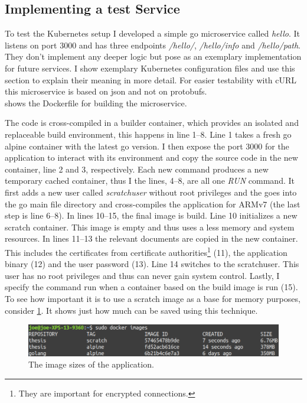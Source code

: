 \subsection{Implementing a test Service} \label{sec:testService}
To test the Kubernetes setup I developed a simple go microservice called \textit{hello}. It listens on port 3000 and has three endpoints \textit{/hello/}, \textit{/hello/info} and \textit{/hello/path}. They don't implement any deeper logic but pose as an exemplary implementation for future services. I show exemplary Kubernetes configuration files and use this section to explain their meaning in more detail. For easier testability with cURL this microservice is based on json and not on protobufs.\\
 shows the Dockerfile for building the microservice.

The code is cross-compiled in a builder container, which provides an isolated and replaceable build environment, this happens in line 1--8. Line 1 takes a fresh go alpine container with the latest go version. I then expose the port 3000 for the application to interact with its environment and copy the source code in the new container, line 2 and 3, respectively. Each new command produces a new temporary cached container, thus I the lines, 4--8, are all one \textit{RUN} command. It first adds a new user called \textit{scratchuser} without root privileges and the goes into the go main file directory and cross-compiles the application for ARMv7 (the last step is line 6--8). In lines 10--15, the final image is build. Line 10 initializes a new scratch container. This image is empty and thus uses a less memory and system resources. In lines 11--13 the relevant documents are copied in the new container. This includes the certificates from certificate authorities\footnote{They are important for encrypted connections.} (11), the application binary (12) and the user password (13). Line 14 switches to the scratchuser. This user has no root privileges and thus can never gain system control. Lastly, I specify the command run when a container based on the build image is run (15).\\
To see how important it is to use a scratch image as a base for memory purposes, consider \cref{fig:imageSizeComparison}. It shows just how much can be saved using this technique.
\begin{figure}[h!]
    \centering
    \includegraphics[scale=0.4]{figures/imageSizeComparison.png}
    \caption{The image sizes of the application.}
    \label{fig:imageSizeComparison}
\end{figure}
